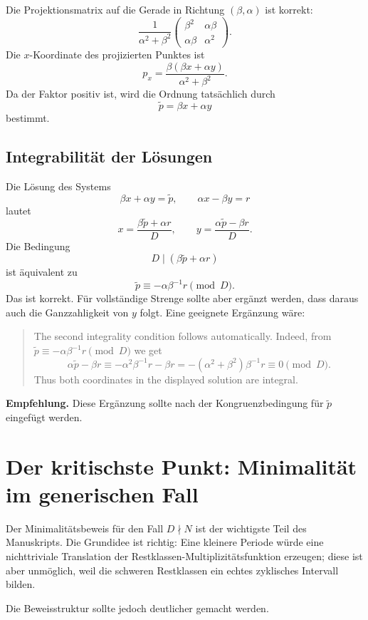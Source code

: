 \documentclass[11pt]{article}
\newcommand{\todo}[1]{\par\medskip\noindent\textbf{Empfehlung.} #1\par\medskip}
\begin{document}
Die Projektionsmatrix auf die Gerade in Richtung \((\beta,\alpha)\) ist korrekt:
\[
    \frac{1}{\alpha^2+\beta^2}
    \begin{pmatrix}
        \beta^2 & \alpha\beta\\
        \alpha\beta & \alpha^2
    \end{pmatrix}.
\]
Die \(x\)-Koordinate des projizierten Punktes ist
\[
    p_x=\frac{\beta(\beta x+\alpha y)}{\alpha^2+\beta^2}.
\]
Da der Faktor positiv ist, wird die Ordnung tatsächlich durch
\[
    \tilde p=\beta x+\alpha y
\]
bestimmt.

\subsection{Integrabilität der Lösungen}

Die Lösung des Systems
\[
    \beta x+\alpha y=\tilde p,
    \qquad
    \alpha x-\beta y=r
\]
lautet
\[
    x=\frac{\beta\tilde p+\alpha r}{D},
    \qquad
    y=\frac{\alpha\tilde p-\beta r}{D}.
\]
Die Bedingung
\[
    D\mid (\beta\tilde p+\alpha r)
\]
ist äquivalent zu
\[
    \tilde p\equiv -\alpha\beta^{-1}r\pmod D.
\]
Das ist korrekt. Für vollständige Strenge sollte aber ergänzt werden, dass daraus auch die Ganzzahligkeit von \(y\) folgt. Eine geeignete Ergänzung wäre:

\begin{quote}
The second integrality condition follows automatically. Indeed, from
\(\tilde p\equiv -\alpha\beta^{-1}r \pmod D\) we get
\[
\alpha\tilde p-\beta r
\equiv
-\alpha^2\beta^{-1}r-\beta r
=
-(\alpha^2+\beta^2)\beta^{-1}r
\equiv 0 \pmod D.
\]
Thus both coordinates in the displayed solution are integral.
\end{quote}

\todo{Diese Ergänzung sollte nach der Kongruenzbedingung für \(\tilde p\) eingefügt werden.}

\section{Der kritischste Punkt: Minimalität im generischen Fall}

Der Minimalitätsbeweis für den Fall \(D\nmid N\) ist der wichtigste Teil des Manuskripts. Die Grundidee ist richtig: Eine kleinere Periode würde eine nichttriviale Translation der Restklassen-Multiplizitätsfunktion erzeugen; diese ist aber unmöglich, weil die schweren Restklassen ein echtes zyklisches Intervall bilden.

Die Beweisstruktur sollte jedoch deutlicher gemacht werden.
\end{document}
